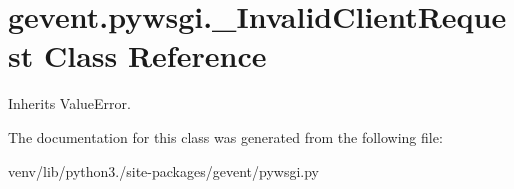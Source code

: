 \hypertarget{classgevent_1_1pywsgi_1_1___invalid_client_request}{}\section{gevent.\+pywsgi.\+\_\+\+Invalid\+Client\+Request Class Reference}
\label{classgevent_1_1pywsgi_1_1___invalid_client_request}


Inherits Value\+Error.



The documentation for this class was generated from the following file\+:\begin{DoxyCompactItemize}
\item 
venv/lib/python3./site-\/packages/gevent/pywsgi.\+py\end{DoxyCompactItemize}
